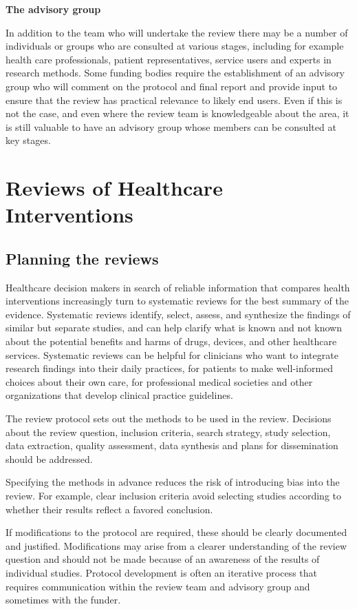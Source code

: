 \documentclass[
  11pt,
  a4paper,
  DIV=11,
  numbers=noendperiod]{scrreprt}
\begin{document}
\textbf{The advisory group}

In addition to the team who will undertake the review there may be a
number of individuals or groups who are consulted at various stages,
including for example health care professionals, patient
representatives, service users and experts in research methods. Some
funding bodies require the establishment of an advisory group who will
comment on the protocol and final report and provide input to ensure
that the review has practical relevance to likely end users. Even if
this is not the case, and even where the review team is knowledgeable
about the area, it is still valuable to have an advisory group whose
members can be consulted at key stages.

\part{Reviews of Healthcare Interventions}

\chapter{Planning the
reviews}\label{sec-planning-systematic-reviews-of-interventions}

Healthcare decision makers in search of reliable information that
compares health interventions increasingly turn to systematic reviews
for the best summary of the evidence. Systematic reviews identify,
select, assess, and synthesize the findings of similar but separate
studies, and can help clarify what is known and not known about the
potential benefits and harms of drugs, devices, and other healthcare
services. Systematic reviews can be helpful for clinicians who want to
integrate research findings into their daily practices, for patients to
make well-informed choices about their own care, for professional
medical societies and other organizations that develop clinical practice
guidelines.

The review protocol sets out the methods to be used in the review.
Decisions about the review question, inclusion criteria, search
strategy, study selection, data extraction, quality assessment, data
synthesis and plans for dissemination should be addressed.

Specifying the methods in advance reduces the risk of introducing bias
into the review. For example, clear inclusion criteria avoid selecting
studies according to whether their results reflect a favored conclusion.

If modifications to the protocol are required, these should be clearly
documented and justified. Modifications may arise from a clearer
understanding of the review question and should not be made because of
an awareness of the results of individual studies. Protocol development
is often an iterative process that requires communication within the
review team and advisory group and sometimes with the funder.
\end{document}
